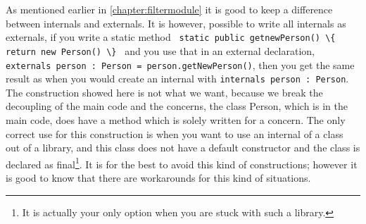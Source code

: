 As mentioned earlier in \autoref{chapter:filtermodule} it is good to keep a difference between internals and externals.
It is however, possible to write all internals as externals, if you write a static method \lstinline! static public getnewPerson() \{ return new Person() \} ! and you use that in an external declaration, \lstinline!externals person : Person = person.getNewPerson()!, then you get the same result as when you would create an internal with \lstinline !internals person : Person!.
The construction showed here is not what we want, because we break the decoupling of the main code and the concerns, the class Person, which is in the main code, does have a method which is solely written for a concern.
The only correct use for this construction is when you want to use an internal of a class out of a library, and this class does not have a default constructor and the class is declared as final\footnote{It is actually your only option when you are stuck with such a library.}. 
It is for the best to avoid this kind of constructions; however it is good to know that there are workarounds for this kind of situations.